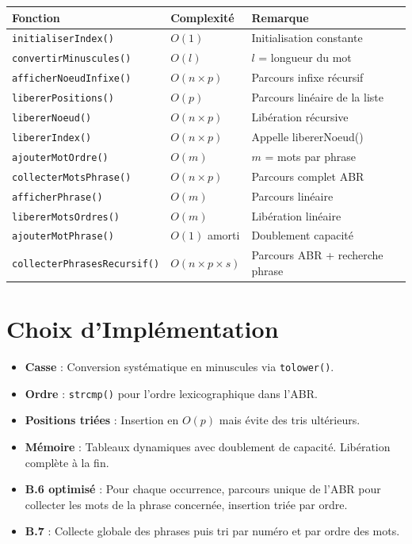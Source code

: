 \documentclass[11pt,a4paper]{article}
\begin{document}
\begin{tabular}{|l|l|l|}
\hline
\textbf{Fonction} & \textbf{Complexité} & \textbf{Remarque} \\
\hline
\texttt{initialiserIndex()} & $O(1)$ & Initialisation constante \\
\hline
\texttt{convertirMinuscules()} & $O(l)$ & $l$ = longueur du mot \\
\hline
\texttt{afficherNoeudInfixe()} & $O(n \times p)$ & Parcours infixe récursif \\
\hline
\texttt{libererPositions()} & $O(p)$ & Parcours linéaire de la liste \\
\hline
\texttt{libererNoeud()} & $O(n \times p)$ & Libération récursive \\
\hline
\texttt{libererIndex()} & $O(n \times p)$ & Appelle libererNoeud() \\
\hline
\texttt{ajouterMotOrdre()} & $O(m)$ & $m$ = mots par phrase \\
\hline
\texttt{collecterMotsPhrase()} & $O(n \times p)$ & Parcours complet ABR \\
\hline
\texttt{afficherPhrase()} & $O(m)$ & Parcours linéaire \\
\hline
\texttt{libererMotsOrdres()} & $O(m)$ & Libération linéaire \\
\hline
\texttt{ajouterMotPhrase()} & $O(1)$ amorti & Doublement capacité \\
\hline
\texttt{collecterPhrasesRecursif()} & $O(n \times p \times s)$ & Parcours ABR + recherche phrase \\
\hline
\end{tabular}

\section{Choix d'Implémentation}

\begin{itemize}[noitemsep]
    \item \textbf{Casse} : Conversion systématique en minuscules via \texttt{tolower()}.
    \item \textbf{Ordre} : \texttt{strcmp()} pour l'ordre lexicographique dans l'ABR.
    \item \textbf{Positions triées} : Insertion en $O(p)$ mais évite des tris ultérieurs.
    \item \textbf{Mémoire} : Tableaux dynamiques avec doublement de capacité. Libération complète à la fin.
    \item \textbf{B.6 optimisé} : Pour chaque occurrence, parcours unique de l'ABR pour collecter les mots de la phrase concernée, insertion triée par ordre.
    \item \textbf{B.7} : Collecte globale des phrases puis tri par numéro et par ordre des mots.
\end{itemize}
\end{document}
